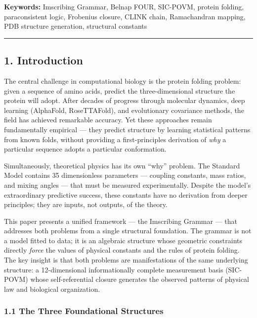 \textbf{Keywords:} Imscribing Grammar, Belnap FOUR, SIC-POVM, protein
folding, paraconsistent logic, Frobenius closure, CLINK chain,
Ramachandran mapping, PDB structure generation, structural constants

\begin{center}\rule{0.5\linewidth}{0.5pt}\end{center}

\hypertarget{introduction}{%
\subsection{1. Introduction}\label{introduction}}

The central challenge in computational biology is the protein folding
problem: given a sequence of amino acids, predict the three-dimensional
structure the protein will adopt. After decades of progress through
molecular dynamics, deep learning (AlphaFold, RoseTTAFold), and
evolutionary covariance methods, the field has achieved remarkable
accuracy. Yet these approaches remain fundamentally empirical --- they
predict structure by learning statistical patterns from known folds,
without providing a first-principles derivation of \emph{why} a
particular sequence adopts a particular conformation.

Simultaneously, theoretical physics has its own ``why'' problem. The
Standard Model contains 35 dimensionless parameters --- coupling
constants, mass ratios, and mixing angles --- that must be measured
experimentally. Despite the model's extraordinary predictive success,
these constants have no derivation from deeper principles; they are
inputs, not outputs, of the theory.

This paper presents a unified framework --- the Imscribing Grammar ---
that addresses both problems from a single structural foundation. The
grammar is not a model fitted to data; it is an algebraic structure
whose geometric constraints directly \emph{force} the values of physical
constants and the rules of protein folding. The key insight is that both
problems are manifestations of the same underlying structure: a
12-dimensional informationally complete measurement basis (SIC-POVM)
whose self-referential closure generates the observed patterns of
physical law and biological organization.

\hypertarget{the-three-foundational-structures}{%
\subsubsection{1.1 The Three Foundational
Structures}\label{the-three-foundational-structures}}

